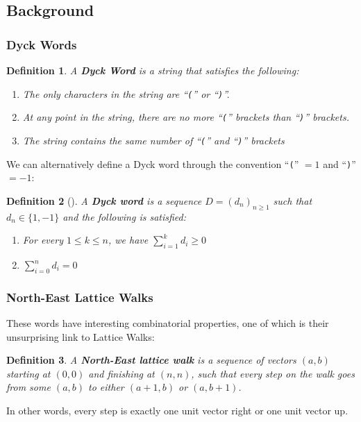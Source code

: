 \newtheorem*{definition}{Definition}
\newtheorem*{theorem}{Theorem}

\subsection{Background}

\subsubsection{Dyck Words}
\begin{definition}
    A \textbf{Dyck Word} is a string that satisfies the following:
    \begin{enumerate}
        \item The only characters in the string are ``\texttt{(}'' or ``\texttt{)}''.
        \item At any point in the string, there are no more ``\texttt{(}'' brackets than ``\texttt{)}'' brackets.
        \item The string contains the same number of ``\texttt{(}'' and ``\texttt{)}'' brackets
    \end{enumerate}
\end{definition}

\noindent We can alternatively define a Dyck word through the convention ``\texttt{(}'' $= 1$ and ``\texttt{)}'' $= -1$:

\begin{definition}[{\cite{chistikov2020re}}]
    A \textbf{Dyck word} is a sequence $D=(d_{n})_{n\geq 1}$ such that ${d_{n}\in\{1, -1\}}$ and the following is satisfied:
    \begin{enumerate}
        \item For every \! $1 \leq k \leq n$, we have \! $\sum_{i = 1}^{k} d_{i} \geq 0$ 
        \item $\sum_{i = 0}^{n} d_{i} = 0$
    \end{enumerate} 
\end{definition}

\subsubsection{North-East Lattice Walks}
\noindent These words have interesting combinatorial properties, one of which is their unsurprising link to Lattice Walks:

\begin{definition}
    A \textbf{North-East lattice walk} is a sequence of vectors $(a, b)$ starting at $(0, 0)$ and finishing at $(n, n)$, such that every step on the walk goes from some $(a, b)$ to either $(a+1, b)$ or $(a, b+1)$.
\end{definition}
\noindent In other words, every step is exactly one unit vector right or one unit vector up.

